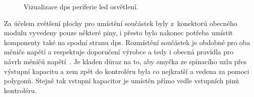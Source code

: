     \begin{figure}[!ht]
        \centering
        \caption{Vizualizace \acs{dps} periferie \acs{led} osvětlení.}
        \label{fig:perif-led-dps}
    \end{figure}

    Za účelem zvětšení plochy pro umístění součástek byly z~konektorů obecného modulu vyvedeny pouze některé piny, i přesto bylo nakonec potřeba umístit komponenty také na spodní stranu \acs{dps}. Rozmístění součástek je obdobné pro oba měniče napětí a respektuje doporučení výrobce a tedy i obecná pravidla pro návrh měničů napětí~\cite{Diodes_AP63356Q}. Je kladen důraz na to, aby smyčka ze spínacího uzlu přes výstupní kapacitu a zem zpět do kontroléru byla co nejkratší a vedena za pomoci polygonů. Stejně tak vstupní kapacitor je umístěn přímo vedle vstupních pinů kontroléru.
    